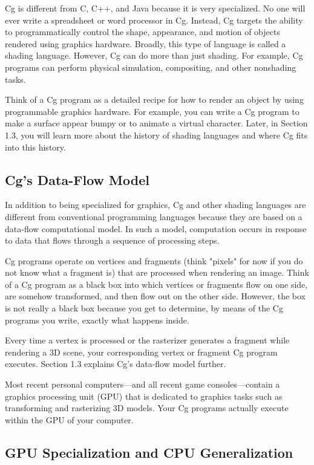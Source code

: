 \documentclass{book}
\begin{document}
Cg is different from C, C++, and Java because it is very specialized. No one will ever write a spreadsheet or word processor in Cg. Instead, Cg targets the ability to programmatically control the shape, appearance, and motion of objects rendered using graphics hardware. Broadly, this type of language is called a shading language. However, Cg can do more than just shading. For example, Cg programs can perform physical simulation, compositing, and other nonshading tasks.

Think of a Cg program as a detailed recipe for how to render an object by using programmable graphics hardware. For example, you can write a Cg program to make a surface appear bumpy or to animate a virtual character. Later, in Section 1.3, you will learn more about the history of shading languages and where Cg fits into this history.

\subsection{Cg's Data-Flow Model}

In addition to being specialized for graphics, Cg and other shading languages are different from conventional programming languages because they are based on a data-flow computational model. In such a model, computation occurs in response to data that flows through a sequence of processing steps.

Cg programs operate on vertices and fragments (think "pixels" for now if you do not know what a fragment is) that are processed when rendering an image. Think of a Cg program as a black box into which vertices or fragments flow on one side, are somehow transformed, and then flow out on the other side. However, the box is not really a black box because you get to determine, by means of the Cg programs you write, exactly what happens inside.

Every time a vertex is processed or the rasterizer generates a fragment while rendering a 3D scene, your corresponding vertex or fragment Cg program executes. Section 1.3 explains Cg's data-flow model further.

Most recent personal computers—and all recent game consoles—contain a graphics processing unit (GPU) that is dedicated to graphics tasks such as transforming and rasterizing 3D models. Your Cg programs actually execute within the GPU of your computer.

\subsection{GPU Specialization and CPU Generalization}
\end{document}
